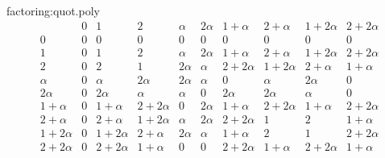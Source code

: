 \begin{answer}{factoring:quot.poly}
\[
\begin{array}{c|ccccccccc}
          &
0         &
1         &
2         & 
\alpha    &
2\alpha   &
1+\alpha  &
2+\alpha  &
1+2\alpha &
2+2\alpha \\
\hline
0         & 0 & 0 & 0 & 0 & 0 & 0 & 0 & 0 & 0 
\\
1         &
0         &
1         &
2         & 
\alpha    &
2\alpha   &
1+\alpha  &
2+\alpha  &
1+2\alpha &
2+2\alpha \\
2         &
0         &
2         &
1         & 
2\alpha    &
\alpha   &
2+2\alpha  &
1+2\alpha  &
2+\alpha &
1+\alpha 
\\
\alpha    &
0         &
\alpha    &
2\alpha   & 
2\alpha   &
 \alpha   &
0  &
\alpha  &
2\alpha &
0 \\
2\alpha   &
0         &
2\alpha   &
\alpha    & 
\alpha    &  
0         &
2\alpha   &
2\alpha   &
\alpha    &
0 \\
1+\alpha   &
0          &
1+\alpha   &
2+2\alpha  & 
0          &  
2\alpha    &
1+\alpha   &
2+2\alpha  &
1+\alpha   &
2+2\alpha \\
2+\alpha   &
0          &
2+\alpha   &
1+2\alpha  & 
\alpha          &  
2\alpha    &
2+2\alpha   &
1  &
2   &
1+\alpha \\
1+2\alpha   &
0          &
1+2\alpha   &
2+\alpha  & 
2\alpha         &  
\alpha  &
1+\alpha   &
2 &
1  &
2+2\alpha \\
2+2\alpha   &
0          &
2+2\alpha   &
1+\alpha  & 
0          &  
0    &
2+2\alpha   &
1+\alpha  &
2+2\alpha   &
1+\alpha   \\
\end{array}
\]
\end{answer}

